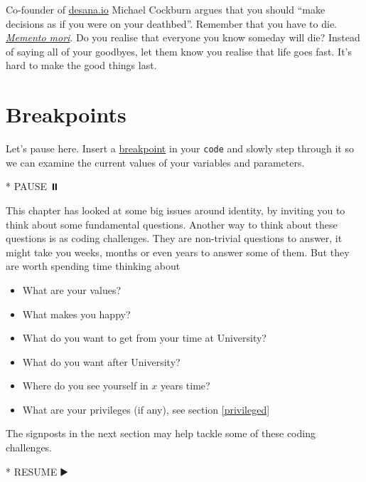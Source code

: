 \documentclass[
]{book}
\newenvironment{Shaded}{\begin{snugshade}}{\end{snugshade}}
\newcommand{\NormalTok}[1]{#1}
\newcommand{\SpecialStringTok}[1]{\textcolor[rgb]{0.31,0.60,0.02}{#1}}
\providecommand{\tightlist}{%
  \setlength{\itemsep}{0pt}\setlength{\parskip}{0pt}}
\begin{document}
Co-founder of \href{https://desana.io/}{desana.io} Michael Cockburn argues that you should ``make decisions as if you were on your deathbed''. \citep{cockburn} Remember that you have to die. \emph{\href{https://en.wikipedia.org/wiki/Memento_mori}{Memento mori}}. Do you realise that everyone you know someday will die? Instead of saying all of your goodbyes, let them know you realise that life goes fast. It's hard to make the good things last. \citep{doyourealise}

\hypertarget{bp2}{%
\section{Breakpoints}\label{bp2}}

Let's pause here. Insert a \href{https://en.wikipedia.org/wiki/Breakpoint}{breakpoint} in your \texttt{code} and slowly step through it so we can examine the current values of your variables and parameters.

\begin{Shaded}
\begin{Highlighting}[]
\SpecialStringTok{* }\NormalTok{PAUSE ⏸️}
\end{Highlighting}
\end{Shaded}

This chapter has looked at some big issues around identity, by inviting you to think about some fundamental questions. Another way to think about these questions is as coding challenges. They are non-trivial questions to answer, it might take you weeks, months or even years to answer some of them. But they are worth spending time thinking about

\begin{itemize}
\tightlist
\item
  What are your values?
\item
  What makes you happy?
\item
  What do you want to get from your time at University?
\item
  What do you want after University?
\item
  Where do you see yourself in \(x\) years time?
\item
  What are your privileges (if any), see section \ref{privileged}
\end{itemize}

The signposts in the next section may help tackle some of these coding challenges.

\begin{Shaded}
\begin{Highlighting}[]
\SpecialStringTok{* }\NormalTok{RESUME ▶️}
\end{Highlighting}
\end{Shaded}
\end{document}
